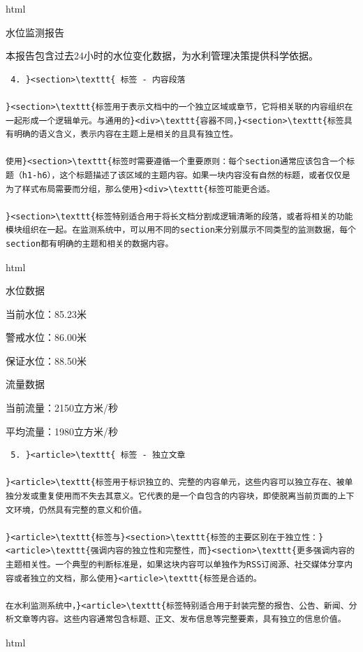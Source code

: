 html

水位监测报告

本报告包含过去24小时的水位变化数据，为水利管理决策提供科学依据。

\begin{lstlisting}
 4. }<section>\texttt{ 标签 - 内容段落

}<section>\texttt{标签用于表示文档中的一个独立区域或章节，它将相关联的内容组织在一起形成一个逻辑单元。与通用的}<div>\texttt{容器不同，}<section>\texttt{标签具有明确的语义含义，表示内容在主题上是相关的且具有独立性。

使用}<section>\texttt{标签时需要遵循一个重要原则：每个section通常应该包含一个标题（h1-h6），这个标题描述了该区域的主题内容。如果一块内容没有自然的标题，或者仅仅是为了样式布局需要而分组，那么使用}<div>\texttt{标签可能更合适。

}<section>\texttt{标签特别适合用于将长文档分割成逻辑清晰的段落，或者将相关的功能模块组织在一起。在监测系统中，可以用不同的section来分别展示不同类型的监测数据，每个section都有明确的主题和相关的数据内容。
\end{lstlisting}

html

水位数据

当前水位：85.23米

警戒水位：86.00米

保证水位：88.50米

流量数据

当前流量：2150立方米/秒

平均流量：1980立方米/秒

\begin{lstlisting}
 5. }<article>\texttt{ 标签 - 独立文章

}<article>\texttt{标签用于标识独立的、完整的内容单元，这些内容可以独立存在、被单独分发或重复使用而不失去其意义。它代表的是一个自包含的内容块，即使脱离当前页面的上下文环境，仍然具有完整的意义和价值。

}<article>\texttt{标签与}<section>\texttt{标签的主要区别在于独立性：}<article>\texttt{强调内容的独立性和完整性，而}<section>\texttt{更多强调内容的主题相关性。一个典型的判断标准是，如果这块内容可以单独作为RSS订阅源、社交媒体分享内容或者独立的文档，那么使用}<article>\texttt{标签是合适的。

在水利监测系统中，}<article>\texttt{标签特别适合用于封装完整的报告、公告、新闻、分析文章等内容。这些内容通常包含标题、正文、发布信息等完整要素，具有独立的信息价值。
\end{lstlisting}

html


